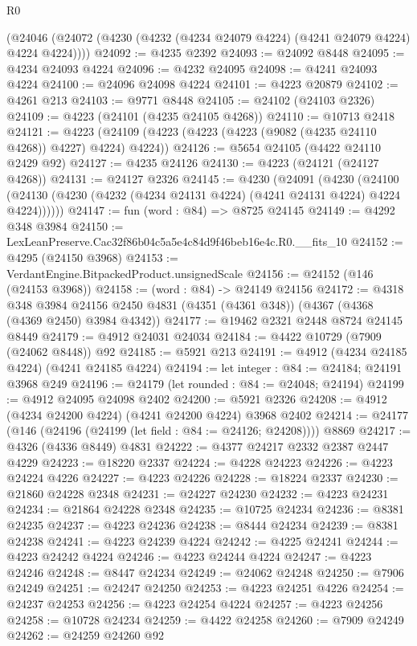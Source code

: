 \begin{lexlean}{R0}
\begin{coremodule}
    (@24046 (@24072 (@4230 (@4232 (@4234 @24079 @4224) (@4241 @24079 @4224) @4224 @4224))))
@24092 := @4235 @2392
@24093 := @24092 @8448
@24095 := @4234 @24093 @4224
@24096 := @4232 @24095
@24098 := @4241 @24093 @4224
@24100 := @24096 @24098 @4224
@24101 := @4223 @20879
@24102 := @4261 @213
@24103 := @9771 @8448
@24105 := @24102 (@24103 @2326)
@24109 := @4223 (@24101 (@4235 @24105 @4268))
@24110 := @10713 @2418
@24121 := @4223 (@24109 (@4223 (@4223 (@4223 (@9082 (@4235 @24110 @4268)) @4227) @4224) @4224))
@24126 := @5654 @24105 (@4422 @24110 @2429 @92)
@24127 := @4235 @24126
@24130 := @4223 (@24121 (@24127 @4268))
@24131 := @24127 @2326
@24145 := @4230
    (@24091
      (@4230
        (@24100 (@24130 (@4230 (@4232 (@4234 @24131 @4224) (@4241 @24131 @4224) @4224 @4224))))))
@24147 := fun (word : @84) => @8725 @24145
@24149 := @4292 @348 @3984
@24150 := LexLeanPreserve.Cac32f86b04c5a5e4c84d9f46beb16e4c.R0.__fits_10
@24152 := @4295 (@24150 @3968)
@24153 := VerdantEngine.BitpackedProduct.unsignedScale
@24156 := @24152 (@146 (@24153 @3968))
@24158 := (word : @84) -> @24149 @24156
@24172 := @4318
    @348
    @3984
    @24156
    @2450
    @4831
    (@4351 (@4361 @348))
    (@4367 (@4368 (@4369 @2450) @3984 @4342))
@24177 := @19462 @2321 @2448 @8724 @24145 @8449
@24179 := @4912 @24031 @24034
@24184 := @4422 @10729 (@7909 (@24062 @8448)) @92
@24185 := @5921 @213
@24191 := @4912 (@4234 @24185 @4224) (@4241 @24185 @4224)
@24194 := let integer : @84 := @24184; @24191 @3968 @249
@24196 := @24179 (let rounded : @84 := @24048; @24194)
@24199 := @4912 @24095 @24098 @2402
@24200 := @5921 @2326
@24208 := @4912 (@4234 @24200 @4224) (@4241 @24200 @4224) @3968 @2402
@24214 := @24177 (@146 (@24196 (@24199 (let field : @84 := @24126; @24208)))) @8869
@24217 := @4326 (@4336 @8449) @4831
@24222 := @4377 @24217 @2332 @2387 @2447 @4229
@24223 := @18220 @2337
@24224 := @4228 @24223
@24226 := @4223 @24224 @4226
@24227 := @4223 @24226
@24228 := @18224 @2337
@24230 := @21860 @24228 @2348
@24231 := @24227 @24230
@24232 := @4223 @24231
@24234 := @21864 @24228 @2348
@24235 := @10725 @24234
@24236 := @8381 @24235
@24237 := @4223 @24236
@24238 := @8444 @24234
@24239 := @8381 @24238
@24241 := @4223 @24239 @4224
@24242 := @4225 @24241
@24244 := @4223 @24242 @4224
@24246 := @4223 @24244 @4224
@24247 := @4223 @24246
@24248 := @8447 @24234
@24249 := @24062 @24248
@24250 := @7906 @24249
@24251 := @24247 @24250
@24253 := @4223 @24251 @4226
@24254 := @24237 @24253
@24256 := @4223 @24254 @4224
@24257 := @4223 @24256
@24258 := @10728 @24234
@24259 := @4422 @24258
@24260 := @7909 @24249
@24262 := @24259 @24260 @92

\end{coremodule}
\end{lexlean}
